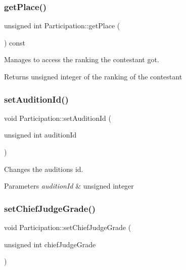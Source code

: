 \subsubsection{\texorpdfstring{get\+Place()}{getPlace()}}
{\footnotesize\ttfamily unsigned int Participation\+::get\+Place (\begin{DoxyParamCaption}{ }\end{DoxyParamCaption}) const}



Manages to access the ranking the contestant got. 

\begin{DoxyReturn}{Returns}
unsigned integer of the ranking of the contestant 
\end{DoxyReturn}
\mbox{\label{class_participation_a0cbd915372021b71926187605f94b386}} 
\subsubsection{\texorpdfstring{set\+Audition\+Id()}{setAuditionId()}}
{\footnotesize\ttfamily void Participation\+::set\+Audition\+Id (\begin{DoxyParamCaption}\item[{unsigned int}]{audition\+Id }\end{DoxyParamCaption})}



Changes the audition\textquotesingle{}s id. 


\begin{DoxyParams}{Parameters}
{\em audition\+Id} & unsigned integer \\
\hline
\end{DoxyParams}
\mbox{\label{class_participation_ad53339e32a85fb8b38f15ee5604e952b}} 
\subsubsection{\texorpdfstring{set\+Chief\+Judge\+Grade()}{setChiefJudgeGrade()}}
{\footnotesize\ttfamily void Participation\+::set\+Chief\+Judge\+Grade (\begin{DoxyParamCaption}\item[{unsigned int}]{chief\+Judge\+Grade }\end{DoxyParamCaption})}



